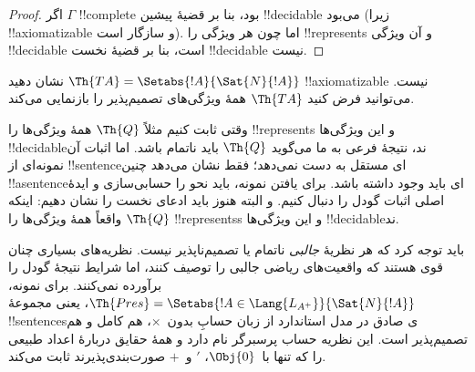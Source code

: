 \documentclass[../../../include/open-logic-section]{subfiles}
\begin{document}
\begin{proof}
اگر $\Gamma$ !!{complete} بود، بنا بر قضیهٔ پیشین !!{decidable} می‌بود
(زیرا !!{axiomatizable} و سازگار است). اما چون هر ویژگی را
!!{represents} و آن ویژگی !!{decidable} است، بنا بر قضیهٔ نخست
!!{decidable} نیست.
\end{proof}

\begin{prob}
نشان دهید $\Th{TA}=\Setabs{!A}{\Sat{N}{!A}}$
!!{axiomatizable} نیست. می‌توانید فرض کنید $\Th{TA}$ همهٔ
ویژگی‌های تصمیم‌پذیر را بازنمایی می‌کند.
\end{prob}

وقتی ثابت کنیم مثلاً $\Th{Q}$ همهٔ ویژگی‌ها را !!{represents}
و این ویژگی‌ها !!{decidable}ند، نتیجهٔ فرعی به ما می‌گوید $\Th{Q}$ باید ناتمام
باشد. اما اثبات آن نمونه‌ای از !!{sentence}ای مستقل به دست نمی‌دهد؛ فقط
نشان می‌دهد چنین !!a{sentence}ای باید وجود داشته باشد. برای یافتن نمونه،
باید نحو را حسابی‌سازی و ایدهٔ اصلی اثبات گودل را دنبال کنیم. و البته
هنوز باید ادعای نخست را نشان دهیم: اینکه $\Th{Q}$ واقعاً همهٔ
ویژگی‌ها را !!{represents}s و این ویژگی‌ها !!{decidable}ند.

باید توجه کرد که هر نظریهٔ \emph{جالبی} ناتمام یا تصمیم‌ناپذیر نیست.
نظریه‌های بسیاری چنان قوی هستند که واقعیت‌های ریاضی جالبی را توصیف
کنند، اما شرایط نتیجهٔ گودل را برآورده نمی‌کنند. برای نمونه،
$\Th{Pres}=\Setabs{!A\in\Lang{L_{A^+}}}{\Sat{N}{!A}}$، یعنی مجموعهٔ
!!{sentence}sی صادق در مدل استاندارد از زبان حسابِ بدون~$\times$، هم
کامل و هم تصمیم‌پذیر است. این نظریه حساب پرسبرگر نام دارد و همهٔ
حقایق دربارهٔ اعداد طبیعی را که تنها با~$\Obj{0}$، $\prime$ و~$+$
صورت‌بندی‌پذیرند ثابت می‌کند.
\end{document}
